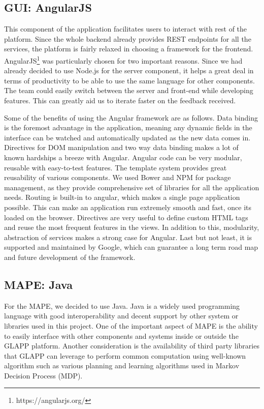 \documentclass{seal_thesis}
\begin{document}
\subsection{GUI: AngularJS}


This component of the application facilitates users to interact with rest of the platform. 
Since the whole backend already provides REST endpoints for all the services, the platform is fairly relaxed in choosing a framework for the frontend. 
AngularJS\footnote{https://angularjs.org/} was particularly chosen for two important reasons. 
Since we had already decided to use Node.js for the server component, it helps a great deal in terms of productivity to be able to use the same language for other components. 
The team could easily switch between the server and front-end while developing features. 
This can greatly aid us to iterate faster on the feedback received. 

Some of the benefits of using the Angular framework are as follows. 
Data binding is the foremost advantage in the application, meaning any dynamic fields in the interface can be watched and automatically updated as the new data comes in. 
Directives for DOM manipulation and two way data binding makes a lot of known hardships a breeze with Angular. 
Angular code can be very modular, reusable with easy-to-test features. 
The template system provides great reusability of various components. 
We used Bower and NPM for package management, as they provide comprehensive set of libraries for all the application needs. 
Routing is built-in to angular, which makes a single page application possible. 
This can make an application run extremely smooth and fast, once its loaded on the browser. 
Directives are very useful to define custom HTML tags and reuse the most frequent features in the views. 
In addition to this, modularity, abstraction of services makes a strong case for Angular. 
Last but not least, it is supported and maintained by Google, which can guarantee a long term road map and future development of the framework.

\subsection{MAPE: Java}
For the MAPE, we decided to use Java.
Java is a widely used programming language with good interoperability and decent support by other system or libraries used in this project.
One of the important aspect of MAPE is the ability to easily interface with other components and systems inside or outside the GLAPP platform.
Another consideration is the availability of third party libraries that GLAPP can leverage to perform common computation using well-known algorithm such as various planning and learning algorithms used in Markov Decision Process (MDP).
\end{document}
